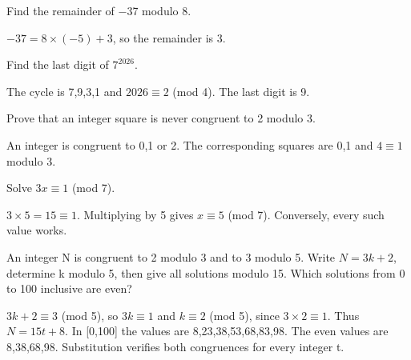 \documentclass[11pt]{article}
\begin{document}
Find the remainder of −37 modulo 8.\par
−\(37 = 8 \times  (-5) + 3\), so the remainder is 3.\par
{}
Find the last digit of \(7^{2026}\).\par
The cycle is 7,9,3,1 and \(2026 \equiv  2\) (mod 4). The last digit is 9.\par
{}
Prove that an integer square is never congruent to 2 modulo 3.\par
An integer is congruent to 0,1 or 2. The corresponding squares are 0,1 and \(4 \equiv  1\) modulo 3.\par
{}
Solve \(3x \equiv  1\) (mod 7).\par
\(3 \times  5 = 15 \equiv  1\). Multiplying by 5 gives \(x \equiv  5\) (mod 7). Conversely, every such value works.\par
{}
An integer N is congruent to 2 modulo 3 and to 3 modulo 5. Write \(N = 3k + 2\), determine k modulo 5, then give all solutions modulo 15. Which solutions from 0 to 100 inclusive are even?\par
\(3k + 2 \equiv  3\) (mod 5), so \(3k \equiv  1\) and \(k \equiv  2\) (mod 5), since \(3 \times  2 \equiv  1\). Thus \(N = 15t + 8\). In [0,100] the values are 8,23,38,53,68,83,98. The even values are 8,38,68,98. Substitution verifies both congruences for every integer t.\par
\end{document}
